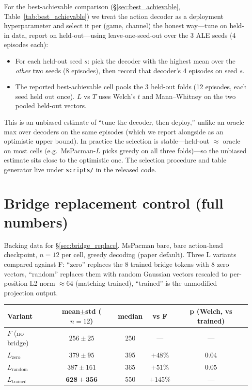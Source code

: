 \documentclass[11pt]{article}
\begin{document}
For the best-achievable comparison (\S\ref{sec:best_achievable}, Table~\ref{tab:best_achievable}) we
treat the action decoder as a deployment hyperparameter and select it per (game, channel) the honest
way---tune on held-in data, report on held-out---using leave-one-seed-out over the 3 ALE seeds
(4 episodes each):
\begin{itemize}[topsep=0pt,itemsep=0pt,leftmargin=*]
\item For each held-out seed $s$: pick the decoder with the highest mean over the \emph{other} two
seeds (8 episodes), then record that decoder's 4 episodes on seed $s$.
\item The reported best-achievable cell pools the 3 held-out folds (12 episodes, each seed held out
once). $L$ vs $T$ uses Welch's $t$ and Mann--Whitney on the two pooled held-out vectors.
\end{itemize}
This is an unbiased estimate of ``tune the decoder, then deploy,'' unlike an oracle max over decoders
on the same episodes (which we report alongside as an optimistic upper bound). In practice the
selection is stable---held-out $\approx$ oracle on most cells (e.g.\ MsPacman-$L$ picks greedy on all
three folds)---so the unbiased estimate sits close to the optimistic one. The selection procedure
and table generator live under \texttt{scripts/} in the released code.

\section{Bridge replacement control (full numbers)}
\label{app:bridge_replace}

Backing data for \S\ref{sec:bridge_replace}. MsPacman bare, bare action-head checkpoint, $n=12$ per cell, greedy decoding (paper default). Three L variants compared against F: ``zero'' replaces the 8 trained bridge tokens with 8 zero vectors, ``random'' replaces them with random Gaussian vectors rescaled to per-position L2 norm $\approx 64$ (matching trained), ``trained'' is the unmodified projection output.

\smallskip\noindent
\begin{tabular}{lcccc}
\toprule
Variant & mean$\pm$std ($n=12$) & median & vs F & p (Welch, vs trained) \\
\midrule
$F$ (no bridge)                & $256\pm25$       & 250  & ---     & --- \\
$L_{\text{zero}}$                & $379\pm95$       & 395  & $+48\%$ & $0.04$ \\
$L_{\text{random}}$              & $387\pm161$      & 365  & $+51\%$ & $0.05$ \\
$L_{\text{trained}}$             & $\mathbf{628\pm356}$ & 550 & $+145\%$ & --- \\
\bottomrule
\end{tabular}\smallskip
\end{document}
